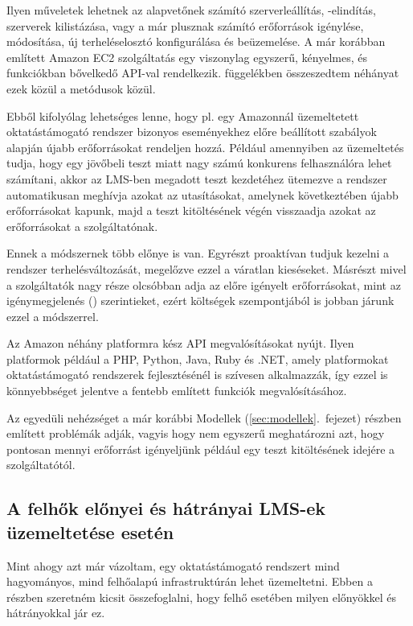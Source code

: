 Ilyen műveletek lehetnek az alapvetőnek számító szerverleállítás, -elindítás, szerverek kilistázása, vagy a már plusznak számító erőforrások igénylése, módosítása, új terheléselosztó konfigurálása és beüzemelése. A már korábban említett Amazon EC2 szolgáltatás egy viszonylag egyszerű, kényelmes, és funkciókban bővelkedő API-val rendelkezik.  függelékben összeszedtem néhányat ezek közül a metódusok közül.


Ebből kifolyólag lehetséges lenne, hogy pl. egy Amazonnál üzemeltetett oktatástámogató rendszer bizonyos eseményekhez előre beállított szabályok alapján újabb erőforrásokat rendeljen hozzá. Például amennyiben az üzemeltetés tudja, hogy egy jövőbeli teszt miatt nagy számú konkurens felhasználóra lehet számítani, akkor az LMS-ben megadott teszt kezdetéhez ütemezve a rendszer automatikusan meghívja azokat az utasításokat, amelynek következtében újabb erőforrásokat kapunk, majd a teszt kitöltésének végén visszaadja azokat az erőforrásokat a szolgáltatónak.

Ennek a módszernek több előnye is van. Egyrészt proaktívan tudjuk kezelni a rendszer terhelésváltozását, megelőzve ezzel a váratlan kieséseket. Másrészt mivel a szolgáltatók nagy része olcsóbban adja az előre igényelt erőforrásokat, mint az igénymegjelenés () szerintieket, ezért költségek szempontjából is jobban járunk ezzel a módszerrel.

Az Amazon néhány platformra kész API megvalósításokat nyújt. Ilyen platformok például a PHP, Python, Java, Ruby és .NET, amely platformokat oktatástámogató rendszerek fejlesztésénél is szívesen alkalmazzák, így ezzel is könnyebbséget jelentve a fentebb említett funkciók megvalósításához.

Az egyedüli nehézséget a már korábbi Modellek (\ref{sec:modellek}.~fejezet) részben említett problémák adják, vagyis hogy nem egyszerű meghatározni azt, hogy pontosan mennyi erőforrást igényeljünk például egy teszt kitöltésének idejére a szolgáltatótól. 

\subsection{A felhők előnyei és hátrányai LMS-ek üzemeltetése esetén}


Mint ahogy azt már vázoltam, egy oktatástámogató rendszert mind hagyományos, mind felhőalapú infrastruktúrán lehet üzemeltetni. Ebben a részben szeretném kicsit összefoglalni, hogy felhő esetében milyen előnyökkel és hátrányokkal jár ez.

